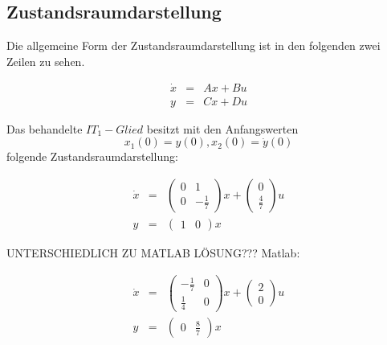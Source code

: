 \subsection{Zustandsraumdarstellung}

Die allgemeine Form der Zustandsraumdarstellung ist in den folgenden zwei Zeilen zu sehen.

\begin{eqnarray*}
	\dot x &=& Ax + Bu \\
	y &=& Cx + Du
\end{eqnarray*}

Das behandelte $IT_1-Glied$ besitzt mit den Anfangswerten \[x_1(0) = y(0),  x_2(0) = \dot y(0)\] folgende Zustandsraumdarstellung:

\begin{eqnarray*}
	\dot x &=& \left(\begin{array}{cc} 0 & 1\\ 0 & -\frac{1}{7}\end{array}\right) x + \left(\begin{array}{c} 0\\ \frac{4}{7}\end{array}\right) u \\
	y &=& \left(\begin{array}{cc} 1 & 0\end{array}\right) x
\end{eqnarray*} 




UNTERSCHIEDLICH ZU MATLAB LÖSUNG???
Matlab:

\begin{eqnarray*}
	\dot x &=& \left(\begin{array}{cc} -\frac{1}{7} & 0\\ \frac{1}{4} & 0\end{array}\right) x + \left(\begin{array}{c} 2\\ 0\end{array}\right) u  \\
	y &=& \left(\begin{array}{cc} 0 & \frac{8}{7}\end{array}\right) x
\end{eqnarray*}